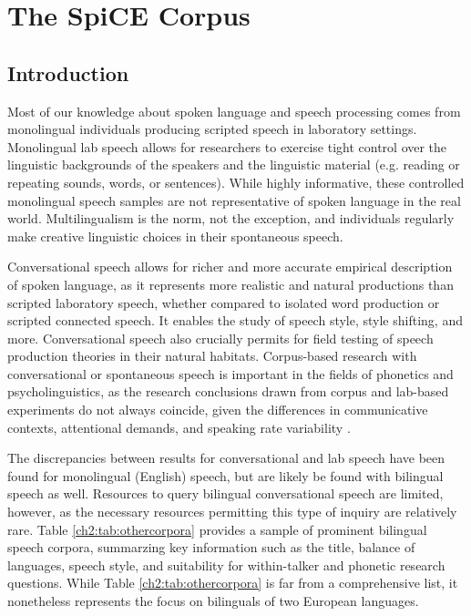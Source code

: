 \setcounter{chapter}{1}

\chapter{The SpiCE Corpus}
\label{ch:Corpus}
\thispagestyle{fancy}

\section{Introduction}\label{ch2:sec:introduction}
Most of our knowledge about spoken language and speech processing comes from monolingual individuals producing scripted speech in laboratory settings. Monolingual lab speech allows for researchers to exercise tight control over the linguistic backgrounds of the speakers and the linguistic material (e.g. reading or repeating sounds, words, or sentences). While highly informative, these controlled monolingual speech samples are not representative of spoken language in the real world. Multilingualism is the norm, not the exception, and individuals regularly make creative linguistic choices in their spontaneous speech.

Conversational speech allows for richer and more accurate empirical description of spoken language, as it represents more realistic and natural productions than scripted laboratory speech, whether compared to isolated word production or scripted connected speech. It enables the study of speech style, style shifting, and more. Conversational speech also crucially permits for field testing of speech production theories in their natural habitats. Corpus-based research with conversational or spontaneous speech is important in the fields of phonetics and psycholinguistics, as the research conclusions drawn from corpus and lab-based experiments do not always coincide, given the differences in communicative contexts, attentional demands, and speaking rate variability \citep[e.g.][]{gahl_2012_reduce, johnson_language_2021}.

The discrepancies between results for conversational and lab speech have been found for monolingual (English) speech, but are likely be found with bilingual speech as well. Resources to query bilingual conversational speech are limited, however, as the necessary resources permitting this type of inquiry are relatively rare. Table \ref{ch2:tab:othercorpora} provides a sample of prominent bilingual speech corpora, summarzing key information such as the title, balance of languages, speech style, and suitability for within-talker and phonetic research questions. While Table \ref{ch2:tab:othercorpora} is far from a comprehensive list, it nonetheless represents the focus on bilinguals of two European languages.

